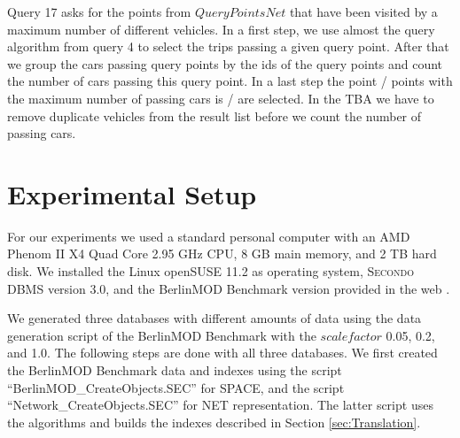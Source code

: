 \documentclass[a4paper]{article}
\newcommand{\secondo}{\textsc{Secondo}}
\newcommand{\bmodb} {BerlinMOD Benchmark}
\begin{document}
Query 17 asks for the points from $QueryPointsNet$ that have been visited by a
maximum number of different vehicles. In a first step, we use almost the query
algorithm from query 4 to select the trips passing a given query
point. After that we group the cars passing query points by the ids of the
query points and count the number of cars passing this query point. In a last
step the point / points with the maximum number of passing cars is / are selected.
In the TBA we have to remove duplicate vehicles from the result list before we
count the number of passing cars.
\section{Experimental Setup}
\label{sec:scenario}
For our experiments we used a standard personal computer with an AMD Phenom II X4
Quad Core 2.95 GHz CPU, 8 GB main memory, and 2 TB hard disk. We installed the
Linux openSUSE 11.2 as operating system, \secondo{} DBMS version 3.0, and
the \bmodb{} version provided in the web \cite{NetworkWeb}.

We generated three databases with different amounts of data using the data generation
script of the \bmodb{} with the $scalefactor$ 0.05, 0.2, and 1.0. The following
steps are done with all three databases. We first created the \bmodb{} data and
indexes using the script ``BerlinMOD\_CreateObjects.SEC'' for SPACE,
and the script ``Network\_CreateObjects.SEC'' for NET representation. The latter
script uses the algorithms and builds the indexes described in Section
 \ref{sec:Translation}.
\end{document}

